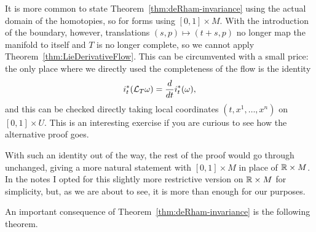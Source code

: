 \begin{remark}
	It is more common to state Theorem~\ref{thm:deRham-invariance} using the actual domain of the homotopies, so for forms using $[0,1]\times M$.
	With the introduction of the boundary, however, translations $(s,p)\mapsto(t+s,p)$ no longer map the manifold to itself and $T$ is no longer complete, so we cannot apply Theorem~\ref{thm:LieDerivativeFlow}.
	This can be circumvented with a small price: the only place where we directly used the completeness of the flow is the identity
	\begin{align}
	  i_t^*(\mathcal{L}_T\omega) = \frac{d}{dt} i_t^*(\omega),
	\end{align}
	and this can be checked directly taking local coordinates $(t, x^1, \ldots, x^n)$ on $[0,1]\times U$. This is an interesting exercise if you are curious to see how the alternative proof goes.

	With such an identity out of the way, the rest of the proof would go through unchanged, giving a more natural statement with $[0,1]\times M$ in place of $\mathbb{R}\times M$.
	In the notes I opted for this slightly more restrictive version on $\mathbb{R}\times M$ for simplicity, but, as we are about to see, it is more than enough for our purposes.
\end{remark}

An important consequence of Theorem~\ref{thm:deRham-invariance} is the following theorem.


